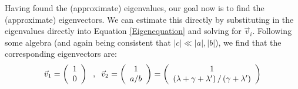 Having found the (approximate) eigenvalues, our goal now is to find the (approximate) eigenvectors. We can estimate this directly by substituting in the eigenvalues directly into Equation \ref{Eigenequation} and solving for $\vec{v}_i$. Following some algebra (and again being consistent that $|c|\ll |a|,|b|$), we find that the corresponding eigenvectors are:
\begin{align*}
    \vec{v}_1= \left( \begin{array}{c}
        1  \\
        0
    \end{array} \right)
    \hspace{2mm},\hspace{2mm}
    \vec{v}_2= \left( \begin{array}{c}
        1  \\
        a/b
    \end{array} \right)
    = \left( \begin{array}{c}
        1  \\
        \left( \lambda+\gamma+\lambda' \right)/\left(\gamma+\lambda' \right)
    \end{array} \right)
\end{align*}

